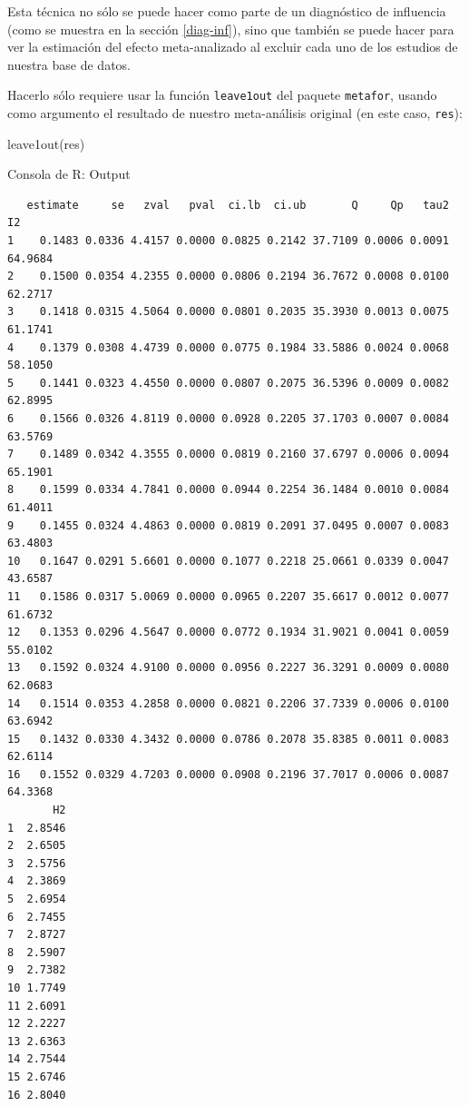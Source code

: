\documentclass[
  bookmarksnumbered]{article}
\newenvironment{Shaded}{\begin{snugshade}}{\end{snugshade}}
\newcommand{\FunctionTok}[1]{\textcolor[rgb]{0.39,0.29,0.61}{#1}}
\newcommand{\NormalTok}[1]{\textcolor[rgb]{0.12,0.11,0.11}{#1}}
\begin{document}
Esta técnica no sólo se puede hacer como parte de un diagnóstico de influencia (como se muestra en la sección \ref{diag-inf}), sino que también se puede hacer para ver la estimación del efecto meta-analizado al excluir cada uno de los estudios de nuestra base de datos.

Hacerlo sólo requiere usar la función \texttt{leave1out} del paquete \texttt{metafor}, usando como argumento el resultado de nuestro meta-análisis original (en este caso, \texttt{res}):

\begin{Shaded}
\begin{Highlighting}[]
\FunctionTok{leave1out}\NormalTok{(res)}
\end{Highlighting}
\end{Shaded}

\begin{ROut}{Consola de R: Output~\thetcbcounter}
                \begin{footnotesize}
                \begin{verbatim} 
   estimate     se   zval   pval  ci.lb  ci.ub       Q     Qp   tau2      I2 
1    0.1483 0.0336 4.4157 0.0000 0.0825 0.2142 37.7109 0.0006 0.0091 64.9684 
2    0.1500 0.0354 4.2355 0.0000 0.0806 0.2194 36.7672 0.0008 0.0100 62.2717 
3    0.1418 0.0315 4.5064 0.0000 0.0801 0.2035 35.3930 0.0013 0.0075 61.1741 
4    0.1379 0.0308 4.4739 0.0000 0.0775 0.1984 33.5886 0.0024 0.0068 58.1050 
5    0.1441 0.0323 4.4550 0.0000 0.0807 0.2075 36.5396 0.0009 0.0082 62.8995 
6    0.1566 0.0326 4.8119 0.0000 0.0928 0.2205 37.1703 0.0007 0.0084 63.5769 
7    0.1489 0.0342 4.3555 0.0000 0.0819 0.2160 37.6797 0.0006 0.0094 65.1901 
8    0.1599 0.0334 4.7841 0.0000 0.0944 0.2254 36.1484 0.0010 0.0084 61.4011 
9    0.1455 0.0324 4.4863 0.0000 0.0819 0.2091 37.0495 0.0007 0.0083 63.4803 
10   0.1647 0.0291 5.6601 0.0000 0.1077 0.2218 25.0661 0.0339 0.0047 43.6587 
11   0.1586 0.0317 5.0069 0.0000 0.0965 0.2207 35.6617 0.0012 0.0077 61.6732 
12   0.1353 0.0296 4.5647 0.0000 0.0772 0.1934 31.9021 0.0041 0.0059 55.0102 
13   0.1592 0.0324 4.9100 0.0000 0.0956 0.2227 36.3291 0.0009 0.0080 62.0683 
14   0.1514 0.0353 4.2858 0.0000 0.0821 0.2206 37.7339 0.0006 0.0100 63.6942 
15   0.1432 0.0330 4.3432 0.0000 0.0786 0.2078 35.8385 0.0011 0.0083 62.6114 
16   0.1552 0.0329 4.7203 0.0000 0.0908 0.2196 37.7017 0.0006 0.0087 64.3368 
       H2 
1  2.8546 
2  2.6505 
3  2.5756 
4  2.3869 
5  2.6954 
6  2.7455 
7  2.8727 
8  2.5907 
9  2.7382 
10 1.7749 
11 2.6091 
12 2.2227 
13 2.6363 
14 2.7544 
15 2.6746 
16 2.8040 
 \end{verbatim}
                \end{footnotesize}
                \end{ROut}
\end{document}
